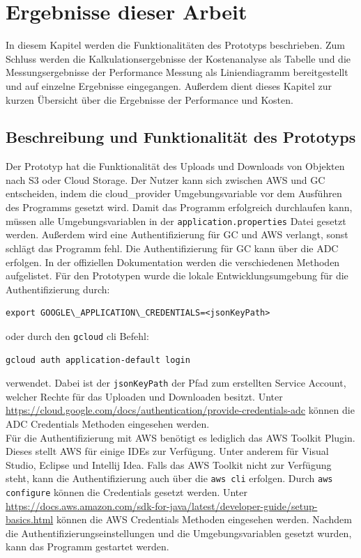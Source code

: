 \chapter{Ergebnisse dieser Arbeit}

In diesem Kapitel werden die Funktionalitäten des Prototyps beschrieben. Zum Schluss werden die Kalkulationsergebnisse der Kostenanalyse als Tabelle und die Messungsergebnisse der Performance Messung als Liniendiagramm bereitgestellt und auf einzelne Ergebnisse eingegangen. Außerdem dient dieses Kapitel zur kurzen Übersicht über die Ergebnisse der Performance und Kosten. 

\section{Beschreibung und Funktionalität des Prototyps}

Der Prototyp hat die Funktionalität des Uploads und Downloads von Objekten nach S3 oder Cloud Storage. Der Nutzer kann sich zwischen AWS und GC entscheiden, indem die cloud\_provider Umgebungsvariable vor dem Ausführen des Programms gesetzt wird. Damit das Programm erfolgreich durchlaufen kann, müssen alle Umgebungsvariablen in der \verb|application.properties| Datei gesetzt werden. Außerdem wird eine Authentifizierung für GC und AWS verlangt, sonst schlägt das Programm fehl. Die Authentifizierung für GC kann über die ADC erfolgen. In der offiziellen Dokumentation werden die verschiedenen Methoden aufgelistet. Für den Prototypen wurde die lokale Entwicklungsumgebung für die Authentifizierung durch: 

\begin{lstlisting}
export GOOGLE\_APPLICATION\_CREDENTIALS=<jsonKeyPath>
\end{lstlisting}
	
	oder durch den \verb|gcloud| cli Befehl: 
	
\begin{lstlisting}
gcloud auth application-default login
\end{lstlisting}
	
	verwendet. Dabei ist der \verb|jsonKeyPath| der Pfad zum erstellten Service Account, welcher Rechte für das Uploaden und Downloaden besitzt. Unter \url{https://cloud.google.com/docs/authentication/provide-credentials-adc} können die ADC Credentials Methoden eingesehen werden.\\
	
Für die Authentifizierung mit AWS benötigt es lediglich das AWS Toolkit Plugin. Dieses stellt AWS für einige IDEs zur Verfügung. Unter anderem für Visual Studio, Eclipse und Intellij Idea. Falls das AWS Toolkit nicht zur Verfügung steht, kann die Authentifizierung auch über die \verb|aws cli| erfolgen. Durch \verb|aws configure| können die Credentials gesetzt werden. Unter \url{https://docs.aws.amazon.com/sdk-for-java/latest/developer-guide/setup-basics.html} können die AWS Credentials Methoden eingesehen werden. Nachdem die Authentifizierungseinstellungen und die Umgebungsvariablen gesetzt wurden, kann das Programm gestartet werden.\\

